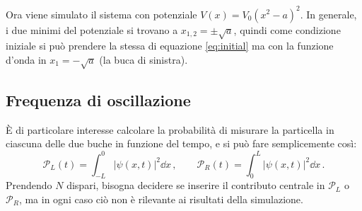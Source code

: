 \documentclass[a4paper, titlepage]{article}
\numberwithin{equation}{section}
\begin{document}
Ora viene simulato il sistema con potenziale $V(x) = V_0(x^2-a)^2$. In generale, i due minimi del potenziale si trovano a $x_{1,2} = \pm \sqrt{a}$, quindi come condizione iniziale si può prendere la stessa di equazione \eqref{eq:initial} ma con la funzione d'onda in $x_1 = -\sqrt{a}$ (la buca di sinistra). 

\subsection{Frequenza di oscillazione}

È di particolare interesse calcolare la probabilità di misurare la particella in ciascuna delle due buche in funzione del tempo, e si può fare semplicemente così:
\[
    \mathcal{P}_L(t) = \int_{-L}^0 |\psi(x,t)|^2 \dd x\, ,
    \qquad
    \mathcal{P}_R(t) = \int_0^L |\psi(x,t)|^2 \dd x\, .
\]
Prendendo $N$ dispari, bisogna decidere se inserire il contributo centrale in $\mathcal{P}_L$ o  $\mathcal{P}_R$, ma in ogni caso ciò non è rilevante ai risultati della simulazione. 
\end{document}
